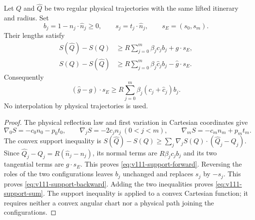 \begin{lemma}
\label{lem:v111-support}
Let $Q$ and $\widehat Q$ be two regular physical trajectories with
the same lifted itinerary and radius. Set
\[
 b_j=1-n_j\cdot\widehat n_j\ge0,\qquad
 s_j=t_j\cdot\widehat n_j,
 \qquad s_E=(s_0,s_m).
\]
Their lengths satisfy
\begin{align}
 S(\widehat Q)-S(Q)
 &\ge R\sum_{j=0}^m\beta_jc_jb_j+g\cdot s_E,
                                      \label{eq:v111-support-forward}\\
 S(Q)-S(\widehat Q)
 &\ge R\sum_{j=0}^m\beta_j\widehat c_jb_j
                                      -\widehat g\cdot s_E.
                                      \label{eq:v111-support-backward}
\end{align}
Consequently
\begin{equation}\label{eq:v111-support-sum}
 (\widehat g-g)\cdot s_E
 \ge R\sum_{j=0}^m\beta_j(c_j+\widehat c_j)b_j.
\end{equation}
No interpolation by physical trajectories is used.
\end{lemma}
\begin{proof}
The physical reflection law and first variation in Cartesian
coordinates give
\[
 \nabla_0S=-c_0n_0-p_0t_0,\qquad
 \nabla_jS=-2c_jn_j\ (0<j<m),\qquad
 \nabla_mS=-c_mn_m+p_mt_m.
\]
The convex support inequality is
$S(\widehat Q)-S(Q)\ge\sum_j\nabla_jS(Q)\cdot(\widehat Q_j-Q_j)$.
Since $\widehat Q_j-Q_j=R(\widehat n_j-n_j)$, its normal terms
are $R\beta_jc_jb_j$ and its two tangential terms are $g\cdot s_E$.
This proves \eqref{eq:v111-support-forward}. Reversing the roles of
the two configurations leaves $b_j$ unchanged and replaces $s_j$
by $-s_j$. This proves \eqref{eq:v111-support-backward}.
Adding the two inequalities proves \eqref{eq:v111-support-sum}.
The support inequality is applied to a convex Cartesian function;
it requires neither a convex angular chart nor a physical path
joining the configurations.
\end{proof}

